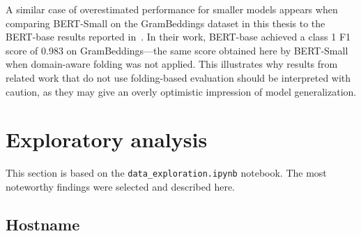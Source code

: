A similar case of overestimated performance for smaller models appears when comparing BERT-Small on the GramBeddings dataset in this thesis to the BERT-base results reported in~\cite{domurlbert}. In their work, BERT-base achieved a class 1 F1 score of 0.983 on GramBeddings—the same score obtained here by BERT-Small when domain-aware folding was not applied. This illustrates why results from related work that do not use folding-based evaluation should be interpreted with caution, as they may give an overly optimistic impression of model generalization.

\begin{table}[H]
    \centering
    \renewcommand{\arraystretch}{1.2}
    \caption{Comparison of performance with and without SLD-based folding using BERT models with baseline parameters shown in Section~\ref{sec:BERT-Tiny-finetune}. Each model in a pair has the same parameters.}
    \label{tab:folding_comparison}
\end{table}

\section{Exploratory analysis}
This section is based on the \texttt{data\_exploration.ipynb} notebook. The most noteworthy findings were selected and described here.

\subsection{Hostname}

